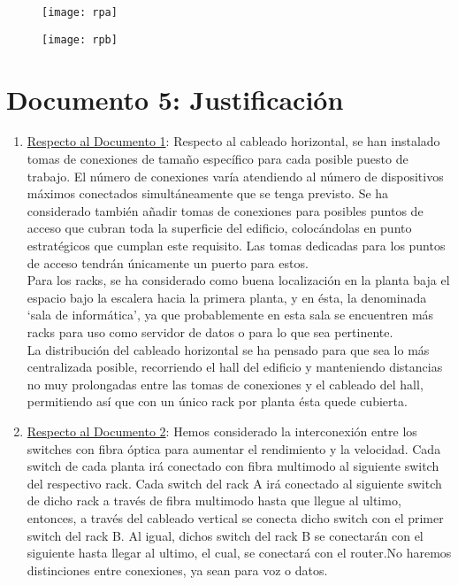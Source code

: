 \documentclass[]{article}
\begin{document}
\begin{figure}[H]
\centering
\texttt{[image: rpa]}
\caption{}
\end{figure}

\begin{figure}[H]
\centering
\texttt{[image: rpb]}
\caption{}
\end{figure}

\newpage

\section{Documento 5: Justificación}

\begin{enumerate}[label=\alph*]
   \item \underline{Respecto al Documento 1}:
	Respecto al cableado horizontal, se han instalado tomas de conexiones de tamaño específico para cada posible puesto de trabajo. El número de conexiones varía atendiendo al número de dispositivos máximos conectados simultáneamente que se tenga previsto. Se ha considerado también añadir tomas de conexiones para posibles puntos de acceso que cubran toda la superficie del edificio, colocándolas en punto estratégicos que cumplan este requisito. Las tomas dedicadas para los puntos de acceso tendrán únicamente un puerto para estos. \\
	Para los racks, se ha  considerado como buena localización en la planta baja el espacio bajo la escalera hacia la primera planta, y en ésta, la denominada `sala de informática', ya que probablemente en esta sala se encuentren más racks para uso como servidor de datos o para lo que sea pertinente. \\
	La distribución del cableado horizontal se ha pensado para que sea lo más centralizada posible, recorriendo el hall del edificio y manteniendo distancias no muy prolongadas entre las tomas de conexiones y el cableado del hall, permitiendo así que con un único rack por planta ésta quede cubierta.
   \item \underline{Respecto al Documento 2}:
        Hemos considerado la interconexión entre los switches con fibra óptica para aumentar el rendimiento y la velocidad. Cada switch de cada planta irá conectado con fibra multimodo al siguiente switch del respectivo rack. Cada switch del rack A irá conectado al siguiente switch de dicho rack a través de fibra multimodo hasta que llegue al ultimo, entonces, a través del cableado vertical se conecta dicho switch con el primer switch del rack B. Al igual, dichos switch del rack B se conectarán con el siguiente hasta llegar al ultimo, el cual, se conectará con el router.No haremos distinciones entre conexiones, ya sean para voz o datos. \\

\end{enumerate}
\end{document}
